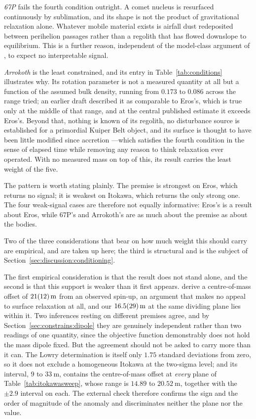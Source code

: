\emph{67P} fails the fourth condition outright. A comet nucleus is
resurfaced continuously by sublimation, and its shape is not the product of
gravitational relaxation alone. Whatever mobile material exists is airfall
dust redeposited between perihelion passages rather than a regolith that has
flowed downslope to equilibrium. This is a further reason, independent of
the model-class argument of \citet{jorda2016}, to expect no interpretable
signal.

\emph{Arrokoth} is the least constrained, and its entry in
Table~\ref{tab:conditions} illustrates why. Its rotation parameter is not a
measured quantity at all but a function of the assumed bulk density, running
from $0.173$ to $0.086$ across the range tried; an earlier draft described
it as comparable to Eros's, which is true only at the middle of that range,
and at the central published estimate it exceeds Eros's. Beyond that,
nothing is known of its regolith, no disturbance source is established for a
primordial Kuiper Belt object, and its surface is thought to have been
little modified since accretion \citep{mckinnon2020}---which satisfies the
fourth condition in the sense of elapsed time while removing any reason to
think relaxation ever operated. With no measured mass on top of this, its
result carries the least weight of the five.

The pattern is worth stating plainly. The premise is strongest on Eros,
which returns no signal; it is weakest on Itokawa, which returns the only
strong one. The four weak-signal cases are therefore not equally
informative: Eros's is a result about Eros, while 67P's and Arrokoth's are
as much about the premise as about the bodies.

Two of the three considerations that bear on how much weight this should
carry are empirical, and are taken up here; the third is structural and is
the subject of Section~\ref{sec:discussion:conditioning}.

The first empirical consideration is that the result does not stand alone,
and the second is that this support is weaker than it first appears.
\citet{lowry2014} derive a centre-of-mass offset of $\SI{21+-12}{\metre}$
from an observed spin-up, an argument that makes no appeal to surface
relaxation at all, and our $\SI{16.5+-2.9}{\metre}$ at the same dividing
plane lies within it. Two inferences resting on different premises agree,
and by Section~\ref{sec:constrains:dipole} they are genuinely independent
rather than two readings of one quantity, since the objective function
demonstrably does not hold the mass dipole fixed. But the agreement should
not be asked to carry more than it can. The Lowry determination is itself
only $1.75$ standard deviations from zero, so it does not exclude a
homogeneous Itokawa at the two-sigma level; and its interval,
$9$ to $\SI{33}{\metre}$, contains the centre-of-mass offset at
\emph{every} plane of Table~\ref{tab:itokawasweep}, whose range is
$14.89$ to $\SI{20.52}{\metre}$, together with the $\pm2.9$ interval on each.
The external check therefore confirms the sign and the order of magnitude of
the anomaly and discriminates neither the plane nor the value.

